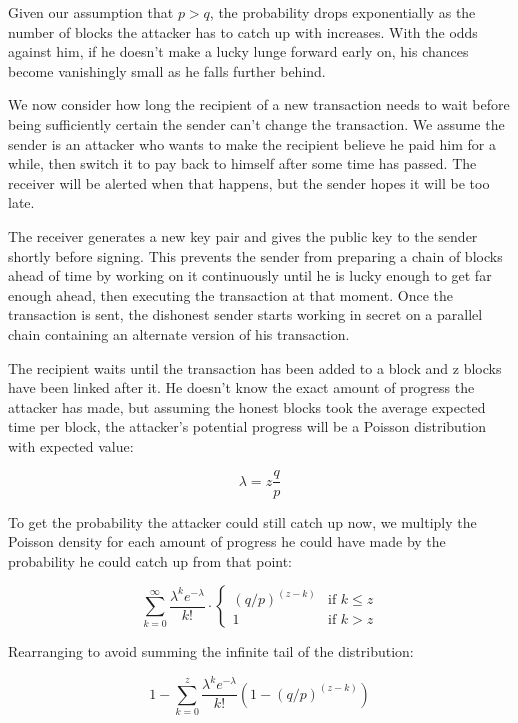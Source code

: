 \documentclass{article}
\begin{document}
Given our assumption that $p > q$, the probability drops exponentially as the number of blocks the attacker has to catch up with increases. With the odds against him, if he doesn't make a lucky lunge forward early on, his chances become vanishingly small as he falls further behind.

We now consider how long the recipient of a new transaction needs to wait before being sufficiently certain the sender can't change the transaction. We assume the sender is an attacker who wants to make the recipient believe he paid him for a while, then switch it to pay back to himself after some time has passed. The receiver will be alerted when that happens, but the sender hopes it will be too late.

The receiver generates a new key pair and gives the public key to the sender shortly before signing. This prevents the sender from preparing a chain of blocks ahead of time by working on it continuously until he is lucky enough to get far enough ahead, then executing the transaction at that moment. Once the transaction is sent, the dishonest sender starts working in secret on a parallel chain containing an alternate version of his transaction.

The recipient waits until the transaction has been added to a block and z blocks have been linked after it. He doesn't know the exact amount of progress the attacker has made, but assuming the honest blocks took the average expected time per block, the attacker's potential progress will be a Poisson distribution with expected value:

\begin{equation}
\lambda = z \frac{q}{p}
\end{equation}

To get the probability the attacker could still catch up now, we multiply the Poisson density for each amount of progress he could have made by the probability he could catch up from that point:

\begin{equation}
\sum_{k=0}^{\infty} \frac{\lambda^k e^{-\lambda}}{k!} \cdot
\begin{cases}
(q/p)^{(z-k)} & \text{if } k \leq z \\
1 & \text{if } k > z
\end{cases}
\end{equation}

Rearranging to avoid summing the infinite tail of the distribution:

\begin{equation}
1 - \sum_{k=0}^{z} \frac{\lambda^k e^{-\lambda}}{k!} \left(1-(q/p)^{(z-k)}\right)
\end{equation}
\end{document}
